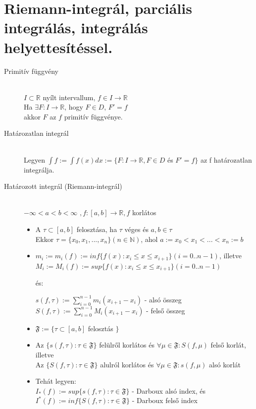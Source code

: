 \documentclass[margin=0px]{article}
\newcommand{\R}{\mathbb{R}}
\begin{document}
	\section{Riemann-integrál, parciális integrálás, integrálás helyettesítéssel.}
		\begin{description}
			\item[Primitív függvény] \hfill \\ 
				$ I \subset \R $ nyílt intervallum, $ f \in I \rightarrow \R $ \\
				Ha $ \exists  F:I\rightarrow\R $, hogy  $ F \in D $, $F' = f$ \\
				akkor $ F $ az $ f $ primitív függvénye.
			
			\item[Határozatlan integrál] \hfill \\
				Legyen $ \int{f} := \int f(x)dx :=  \{F:I \rightarrow \R, F \in D $ 
				és $ F' = f  \} $ az f határozatlan integrálja.
				
			\item[Határozott integrál (Riemann-integrál)] \hfill \\
				$ -\infty < a < b < \infty$
				$, f:[a,b] \rightarrow \R, f $ korlátos
				\begin{itemize}
					\item
					A $ \tau \subset [a,b] $ felosztása, ha $ \tau $ véges és $ a,b \in \tau $ \\
					Ekkor $ \tau = \{x_0, x_1, ..., x_n \} (n \in \mathbb{N}) $, ahol 
					$ a := x_0 < x_1 < ... < x_n := b$ 
					\item 
					$ m_i := m_i(f) := inf\{f(x): x_i \leq x \leq x_{i+1} \} (i = 0..n-1)$, illetve \\
					$ M_i := M_i(f) := sup\{f(x): x_i \leq x \leq x_{i+1} \} (i = 0..n-1)$
					
					és:
					
					$ s(f, \tau) := \sum\limits_{i=0}^{n-1} m_i(x_{i+1} - x_i) $ - alsó összeg \\
					$ S(f, \tau) := \sum\limits_{i=0}^{n-1} M_i(x_{i+1} - x_i) $ - felső összeg
					
					\item 
					$ \mathfrak{F} := \{ \tau \subset [a,b] $ felosztás $\}$
					\item
					Az $ \{ s(f, \tau): \tau \in \mathfrak{F} \} $ felülről korlátos és $ \forall \mu \in \mathfrak{F} : S(f, \mu) $ felső korlát, illetve \\
					Az $ \{ S(f, \tau): \tau \in \mathfrak{F} \} $ alulról korlátos és $ \forall \mu \in \mathfrak{F} : s(f, \mu) $ alsó korlát
					\item 
					Tehát legyen: \\ $ I_*(f) := sup\{ s(f,\tau) : \tau \in \mathfrak{F} \}$ - Darboux alsó index, és \\
					$ I^*(f) := inf\{ S(f,\tau) : \tau \in \mathfrak{F} \}$ - Darboux felső index
				\end{itemize}
				

\end{description}
\end{document}
